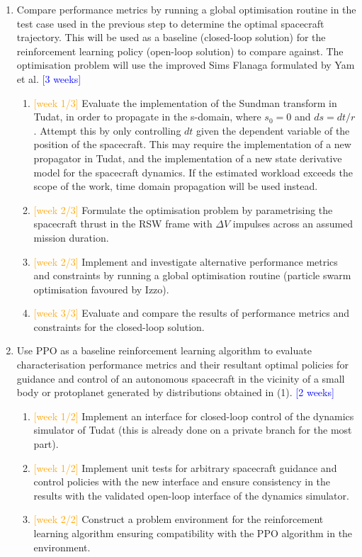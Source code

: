 \begin{enumerate}
    \item Compare performance metrics by running a global optimisation routine in the test case used in the previous step to determine the optimal spacecraft trajectory. This will be used as a baseline (closed-loop solution) for the reinforcement learning policy (open-loop solution) to compare against. The optimisation problem will use the improved Sims Flanaga formulated by Yam et al. \cite{Yam2010} \textcolor{blue}{[3 weeks]}
    \begin{enumerate}
        \item \textcolor{orange}{[week 1/3]} Evaluate the implementation of the Sundman transform in Tudat, in order to propagate in the s-domain, where $s_0=0$ and $ds=dt/r$. Attempt this by only controlling $dt$ given the dependent variable of the position of the spacecraft. This may require the implementation of a new propagator in Tudat, and the implementation of a new state derivative model for the spacecraft dynamics. If the estimated workload exceeds the scope of the work, time domain propagation will be used instead.
        \item \textcolor{orange}{[week 2/3]} Formulate the optimisation problem by parametrising the spacecraft thrust in the RSW frame with $\Delta{V}$ impulses across an assumed mission duration.
        \item \textcolor{orange}{[week 2/3]} Implement and investigate alternative performance metrics and constraints by running a global optimisation routine (particle swarm optimisation favoured by Izzo).
        \item \textcolor{orange}{[week 3/3]} Evaluate and compare the results of performance metrics and constraints for the closed-loop solution.
    \end{enumerate}

    \item Use \gls{PPO} as a baseline reinforcement learning algorithm to evaluate characterisation performance metrics and their resultant optimal policies for guidance and control of an autonomous spacecraft in the vicinity of a small body or protoplanet generated by distributions obtained in (1). \textcolor{blue}{[2 weeks]}
          \begin{enumerate}
              \item \textcolor{orange}{[week 1/2]} Implement an interface for closed-loop control of the dynamics simulator of Tudat (this is already done on a private branch for the most part).
              \item \textcolor{orange}{[week 1/2]} Implement unit tests for arbitrary spacecraft guidance and control policies with the new interface and ensure consistency in the results with the validated open-loop interface of the dynamics simulator.
              \item \textcolor{orange}{[week 2/2]} Construct a problem environment for the reinforcement learning algorithm ensuring compatibility with the \gls{PPO} algorithm in the environment.
          \end{enumerate}


\end{enumerate}
